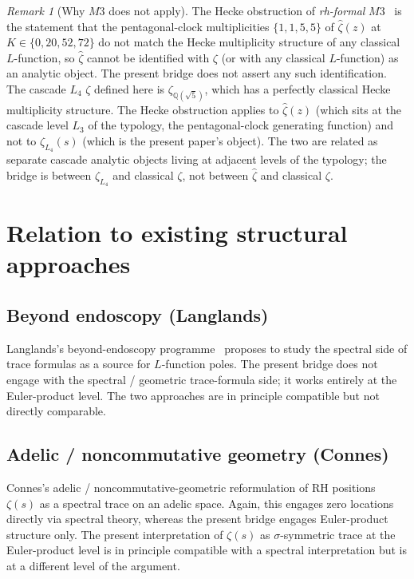 \documentclass[11pt,a4paper]{article}
\theoremstyle{definition}
\theoremstyle{remark}
\newtheorem{remark}[theorem]{Remark}
\begin{document}
\begin{remark}[Why $M3$ does not apply]\label{rem:m3}
The Hecke obstruction of \emph{rh-formal} $M3$~\cite{rhFormalSmart} is
the statement that the pentagonal-clock multiplicities $\{1,1,5,5\}$ of
$\hat{\zeta}(z)$ at $K \in \{0, 20, 52, 72\}$ do not match the Hecke
multiplicity structure of any classical $L$-function, so $\hat{\zeta}$
cannot be identified with $\zeta$ (or with any classical $L$-function)
as an analytic object. The present bridge does not assert any such
identification. The cascade $L_4$ $\zeta$ defined here is
$\zeta_{\mathbb{Q}(\sqrt{5})}$, which has a perfectly classical Hecke
multiplicity structure. The Hecke obstruction applies to
$\hat{\zeta}(z)$ (which sits at the cascade level $L_3$ of the
typology, the pentagonal-clock generating function) and not to
$\zeta_{L_4}(s)$ (which is the present paper's object). The two are
related as separate cascade analytic objects living at adjacent levels
of the typology; the bridge is between $\zeta_{L_4}$ and classical
$\zeta$, not between $\hat{\zeta}$ and classical $\zeta$.
\end{remark}

\section{Relation to existing structural approaches}\label{sec:relation}

\subsection{Beyond endoscopy (Langlands)}

Langlands's beyond-endoscopy programme~\cite{LanglandsBeyond} proposes
to study the spectral side of trace formulas as a source for $L$-function
poles. The present bridge does not engage with the spectral / geometric
trace-formula side; it works entirely at the Euler-product level. The
two approaches are in principle compatible but not directly comparable.

\subsection{Adelic / noncommutative geometry (Connes)}

Connes's adelic / noncommutative-geometric reformulation of RH
\cite{ConnesAdelic} positions $\zeta(s)$ as a spectral trace on an
adelic space. Again, this engages zero locations directly via spectral
theory, whereas the present bridge engages Euler-product structure
only. The present interpretation of $\zeta(s)$ as $\sigma$-symmetric
trace at the Euler-product level is in principle compatible with a
spectral interpretation but is at a different level of the argument.
\end{document}

